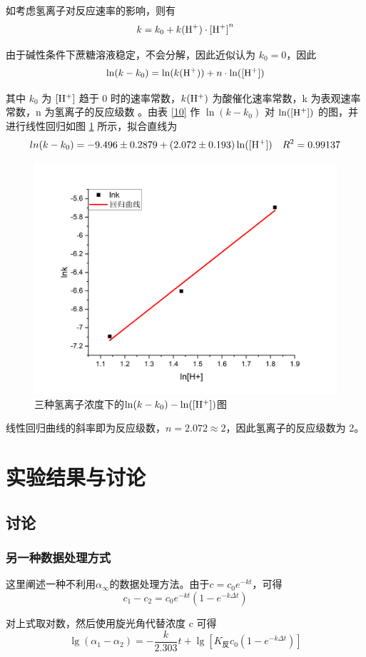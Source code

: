 \documentclass[cn,hazy,pku,12pt,normal,math=newtx,cite=super]{elegantnote}
\begin{document}
如考虑氢离子对反应速率的影响，则有
$$
k = k_0 + k({\rm H^+}) \cdot {\rm [H^+]}^n
$$


由于碱性条件下蔗糖溶液稳定，不会分解，因此近似认为 $k_0=0$，因此
$$
\ln(k-k_0)=\ln(k({\rm H^+})) + n \cdot \ln({\rm [H^+]})
$$

其中 $k_0$ 为 $\rm [H^+]$ 趋于 0 时的速率常数，$ k({\rm H^+})$ 为酸催化速率常数，k 为表观速率常数，n 为氢离子的反应级数
。由表 \ref{10} 作 $\ln(k-k_0)$ 对 $\ln({\rm [H^+]})$ 的图，并进行线性回归如图 \ref{11} 所示，拟合直线为
$$
ln(k-k_0) = -9.496 \pm 0.2879 + (2.072 \pm 0.193 ) \ln({\rm [H^+]}) \quad R^2 = 0.99137
$$

\begin{figure}[h]
    \centering
    \includegraphics[width = .60\textwidth]{image/Graph13.png}
    \caption{ 三种氢离子浓度下的$\ln(k-k_0) - \ln({\rm [H^+]})$图}\label{11}
\end{figure}

线性回归曲线的斜率即为反应级数，$n = 2.072 \approx  2$，因此氢离子的反应级数为 2。


\section{实验结果与讨论}

\subsection{讨论}

\subsubsection{另一种数据处理方式}

这里阐述一种不利用$\alpha_\infty$的数据处理方法。由于$c = c_0e^{-kt}$，可得
$$
c_1 - c_2 = c_0e^{-kt}(1-e^{-k \Delta t})
$$

对上式取对数，然后使用旋光角代替浓度 c 可得
$$
\lg(\alpha_1 - \alpha_2) = - \frac{k}{2.303}t + \lg[K_{反}c_0(1-e^{-k \Delta t})]
$$
\end{document}
